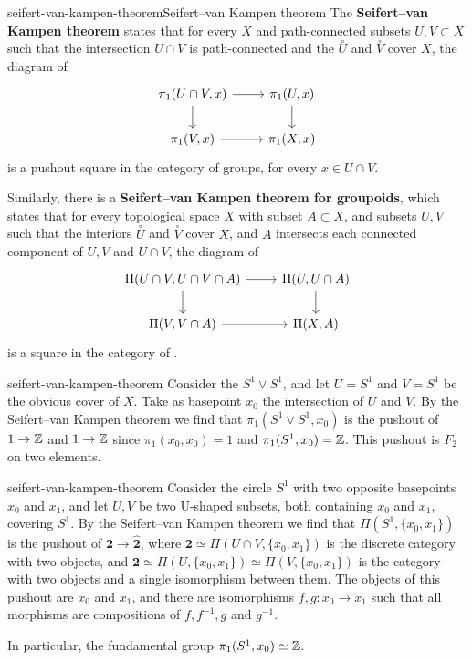 \begin{topic}{seifert-van-kampen-theorem}{Seifert--van Kampen theorem}
    The \textbf{Seifert--van Kampen theorem} states that for every   $X$ and path-connected subsets $U, V \subset X$ such that the intersection $U \cap V$ is path-connected and the  $\overset{\circ}{U}$ and $\overset{\circ}{V}$ cover $X$, the diagram of 
    \[ \begin{tikzcd} \pi_1(U \cap V, x) \arrow{d} \arrow{r} & \pi_1(U, x) \arrow{d} \\ \pi_1(V, x) \arrow{r} & \pi_1(X, x) \end{tikzcd} \]
    is a pushout square in the category of groups, for every $x \in U \cap V$.

    Similarly, there is a \textbf{Seifert--van Kampen theorem for groupoids}, which states that for every topological space $X$ with subset $A \subset X$, and subsets $U, V$ such that the interiors $\overset{\circ}{U}$ and $\overset{\circ}{V}$ cover $X$, and $A$ intersects each connected component of $U, V$ and $U \cap V$, the diagram of 
    \[ \begin{tikzcd} \Pi(U \cap V, U \cap V \cap A) \arrow{d} \arrow{r} & \Pi(U, U \cap A) \arrow{d} \\ \Pi(V, V \cap A) \arrow{r} & \Pi(X, A) \end{tikzcd} \]
    is a  square in the category of .
\end{topic}

\begin{example}{seifert-van-kampen-theorem}
    Consider the  $S^1 \vee S^1$, and let $U = S^1$ and $V = S^1$ be the obvious cover of $X$. Take as basepoint $x_0$ the intersection of $U$ and $V$. By the Seifert--van Kampen theorem we find that $\pi_1(S^1 \vee S^1, x_0)$ is the pushout of $1 \to \mathbb{Z}$ and $1 \to \mathbb{Z}$ since $\pi_1(x_0, x_0) = 1$ and $\pi_1(S^1, x_0) = \mathbb{Z}$. This pushout is  $F_2$ on two elements.
\end{example}

\begin{example}{seifert-van-kampen-theorem}
    Consider the circle $S^1$ with two opposite basepoints $x_0$ and $x_1$, and let $U, V$ be two U-shaped subsets, both containing $x_0$ and $x_1$, covering $S^1$. By the Seifert--van Kampen theorem we find that $\Pi(S^1, \{ x_0, x_1 \})$ is the pushout of $\textbf{2} \to \hat{\textbf{2}}$, where $\textbf{2} \simeq \Pi(U \cap V, \{ x_0, x_1 \})$ is the discrete category with two objects, and $\hat{\textbf{2}} \simeq \Pi(U, \{ x_0, x_1 \}) \simeq \Pi(V, \{ x_0, x_1 \})$ is the category with two objects and a single isomorphism between them. The objects of this pushout are $x_0$ and $x_1$, and there are isomorphisms $f, g : x_0 \to x_1$ such that all morphisms are compositions of $f, f^{-1}, g$ and $g^{-1}$.
    
    In particular, the fundamental group $\pi_1(S^1, x_0) \simeq \mathbb{Z}$.
\end{example}

